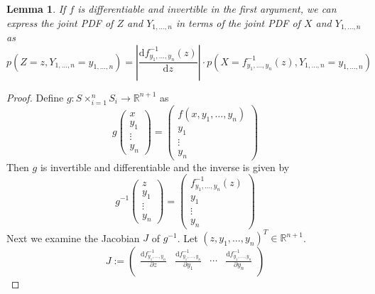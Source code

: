 \documentclass[11pt,a4paper]{book}
\newtheorem{lemma}{Lemma}
\begin{document}
\begin{lemma}
  \label{lemma:joint-pdf}
  If $f$ is differentiable and invertible in the first argument, we can express
  the joint PDF of $Z$ and $Y_{1, \dots, n}$ in terms of the joint PDF of $X$
  and $Y_{1, \dots, n}$ as
  \begin{equation*}
    p(Z = z, Y_{1, \dots, n} = y_{1, \dots, n}) = \left| \frac{\mathrm{d}f_{y_{1}, \dots, y_{n}}^{-1}(z)}{\mathrm{d}z} \right| \cdot p\left(X = f_{y_{1}, \dots, y_{n}}^{-1}(z), Y_{1, \dots, n} = y_{1, \dots, n}\right)
  \end{equation*}
\end{lemma}
\begin{proof}
  Define $g : S \times_{i = 1}^{n} S_{i} \rightarrow \mathbb{R}^{n + 1}$ as
  \begin{equation*}
    g \begin{pmatrix}
      x\\y_{1}\\\vdots\\y_{n}
    \end{pmatrix} = \begin{pmatrix}
      f(x, y_{1}, \dots, y_{n})\\
      y_{1}\\\vdots\\y_{n}
    \end{pmatrix}
  \end{equation*}
  Then $g$ is invertible and differentiable and the inverse is given by
  \begin{equation*}
    g^{-1}\begin{pmatrix}
      z\\y_{1}\\\vdots\\y_{n}
    \end{pmatrix} = \begin{pmatrix}
      f_{y_{1}, \dots, y_{n}}^{-1}(z)\\
      y_{1}\\\vdots\\y_{n}
    \end{pmatrix}
  \end{equation*}
  Next we examine the Jacobian $J$ of $g^{-1}$. Let
  $(z, y_{1}, \dots, y_{n})^{T} \in \mathbb{R}^{n + 1}$.
  \begin{equation*}
    J :=
    \begin{pmatrix}
      \frac{\mathrm{d}f_{y_{1}, \dots, y_{n}}^{-1}}{\partial z} & \frac{\mathrm{d}f_{y_{1}, \dots, y_{n}}^{-1}}{\partial y_{1}} & \cdots & \frac{\mathrm{d}f_{y_{1}, \dots, y_{n}}^{-1}}{\partial y_{n}}\\

\end{pmatrix}
\end{equation*}
\end{proof}
\end{document}
